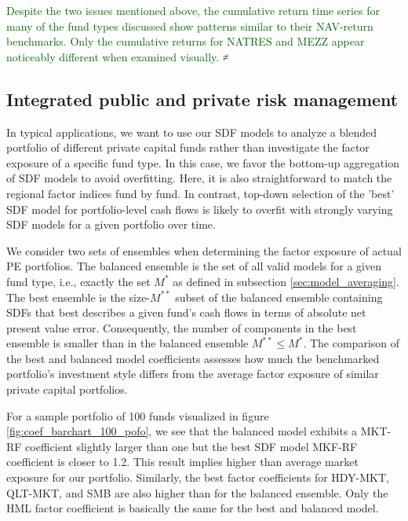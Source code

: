 \documentclass[12pt]{article}
\begin{document}
\textcolor{darkgreen}{
	Despite the two issues mentioned above, the cumulative return time series for many of the fund types discussed show patterns similar to their NAV-return benchmarks. 
	Only the cumulative returns for NATRES and MEZZ appear noticeably different when examined visually.
≠
}


\iffalse

\subsection{Integrated public and private risk management}
\label{sec:integrated_risk}

In typical applications, we want to use our SDF models to analyze a blended portfolio of different private capital funds rather than investigate the factor exposure of a specific fund type.
In this case, we favor the bottom-up aggregation of SDF models to avoid overfitting.
Here, it is also straightforward to match the regional factor indices fund by fund.
In contrast, top-down selection of the 'best' SDF model for portfolio-level cash flows is likely to overfit with strongly varying SDF models for a given portfolio over time.

We consider two sets of ensembles when determining the factor exposure of actual PE portfolios.
The balanced ensemble is the set of all valid models for a given fund type, i.e., exactly the set $M^*$ as defined in subsection \ref{sec:model_averaging}.
The best ensemble is the size-$M^{**}$ subset of the balanced ensemble containing SDFs that best describes a given fund's cash flows in terms of absolute net present value error. 
Consequently, the number of components in the best ensemble is smaller than in the balanced ensemble $M^{**} \leq M^*$.
The comparison of the best and balanced model coefficients assesses how much the benchmarked portfolio's investment style differs from the average factor exposure of similar private capital portfolios.

For a sample portfolio of 100 funds visualized in figure \ref{fig:coef_barchart_100_pofo}, we see that the balanced model exhibits a MKT-RF coefficient slightly larger than one but the best SDF model MKF-RF coefficient is closer to 1.2.
This result implies higher than average market exposure for our portfolio.
Similarly, the best factor coefficients for HDY-MKT, QLT-MKT, and SMB are also higher than for the balanced ensemble.
Only the HML factor coefficient is basically the same for the best and balanced model.
\end{document}
